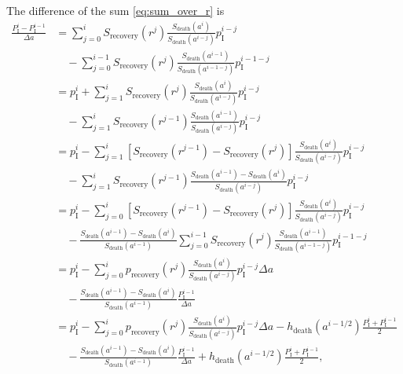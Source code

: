 \documentclass[12pt]{article}
\begin{document}
The difference of the sum \eqref{eq:sum_over_r} is
\begin{equation}
  \label{eq:sum_difference}
  \begin{split}
    \frac{P_{\mathrm{I}}^i - P_{\mathrm{I}}^{i - 1}}{\Delta a}
    &=
    \sum_{j = 0}^i S_{\text{recovery}}(r^j)
    \frac{S_{\text{death}}(a^i)}{S_{\text{death}}(a^{i - j})}
    p_{\mathrm{I}}^{i - j}
    \\ & \quad {}
    - \sum_{j = 0}^{i - 1} S_{\text{recovery}}(r^j)
    \frac{S_{\text{death}}(a^{i - 1})}{S_{\text{death}}(a^{i - 1 - j})}
    p_{\mathrm{I}}^{i - 1 - j}
    \\
    &= p_{\mathrm{I}}^i
    + \sum_{j = 1}^i S_{\text{recovery}}(r^j)
    \frac{S_{\text{death}}(a^i)}{S_{\text{death}}(a^{i - j})}
    p_{\mathrm{I}}^{i - j}
    \\ & \quad {}
    - \sum_{j = 1}^i S_{\text{recovery}}(r^{j - 1})
    \frac{S_{\text{death}}(a^{i - 1})}{S_{\text{death}}(a^{i - j})}
    p_{\mathrm{I}}^{i - j}
    \\
    &= p_{\mathrm{I}}^i
    - \sum_{j = 1}^i
    \left[
      S_{\text{recovery}}(r^{j - 1})
      - S_{\text{recovery}}(r^j)
    \right]
    \frac{S_{\text{death}}(a^i)}{S_{\text{death}}(a^{i - j})}
    p_{\mathrm{I}}^{i - j}
    \\ & \quad {}
    - \sum_{j = 1}^i S_{\text{recovery}}(r^{j - 1})
    \frac{S_{\text{death}}(a^{i - 1}) - S_{\text{death}}(a^i)}
    {S_{\text{death}}(a^{i - j})}
    p_{\mathrm{I}}^{i - j}
    \\
    &= p_{\mathrm{I}}^i
    - \sum_{j = 0}^i
    \left[
      S_{\text{recovery}}(r^{j - 1})
      - S_{\text{recovery}}(r^j)
    \right]
    \frac{S_{\text{death}}(a^i)}{S_{\text{death}}(a^{i - j})}
    p_{\mathrm{I}}^{i - j}
    \\ & \quad {}
    -
    \frac{S_{\text{death}}(a^{i - 1}) - S_{\text{death}}(a^i)}
    {S_{\text{death}}(a^{i - 1})}
    \sum_{j = 0}^{i - 1} S_{\text{recovery}}(r^j)
    \frac{S_{\text{death}}(a^{i - 1})}{S_{\text{death}}(a^{i - 1 - j})}
    p_{\mathrm{I}}^{i - 1 - j}
    \\
    &= p_{\mathrm{I}}^i
    - \sum_{j = 0}^i p_{\text{recovery}}(r^j)
    \frac{S_{\text{death}}(a^i)}{S_{\text{death}}(a^{i - j})}
    p_{\mathrm{I}}^{i - j} \Delta a
    \\ & \quad {}
    - \frac{S_{\text{death}}(a^{i - 1}) - S_{\text{death}}(a^i)}
    {S_{\text{death}}(a^{i - 1})}
    \frac{P_{\mathrm{I}}^{i - 1}}{\Delta a}
    \\
    &= p_{\mathrm{I}}^i
    - \sum_{j = 0}^i p_{\text{recovery}}(r^j)
    \frac{S_{\text{death}}(a^i)}{S_{\text{death}}(a^{i - j})}
    p_{\mathrm{I}}^{i - j} \Delta a
    - h_{\text{death}}(a^{i - 1 / 2})
    \frac{P_{\mathrm{I}}^i + P_{\mathrm{I}}^{i - 1}}{2}
    \\ & \quad {}
    - \frac{S_{\text{death}}(a^{i - 1}) - S_{\text{death}}(a^i)}
    {S_{\text{death}}(a^{i - 1})}
    \frac{P_{\mathrm{I}}^{i - 1}}{\Delta a}
    + h_{\text{death}}(a^{i - 1 / 2})
    \frac{P_{\mathrm{I}}^i + P_{\mathrm{I}}^{i - 1}}{2},
  \end{split}
\end{equation}
\end{document}
